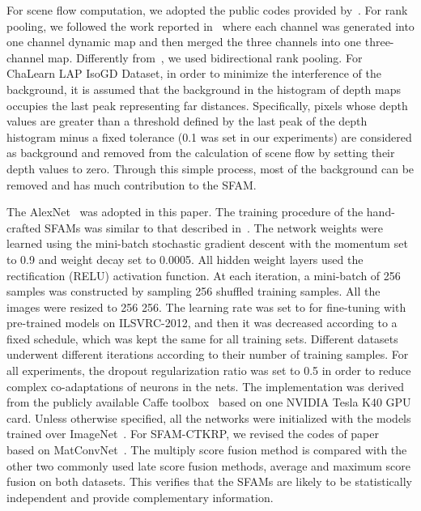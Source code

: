 \documentclass[10pt,twocolumn,letterpaper]{article}
\begin{document}
For scene flow computation, we adopted the public codes provided 
by~\cite{jaimezprimal}.
For rank pooling, we followed the work reported in~\cite{bilen2016dynamic} where 
each channel was generated into one channel dynamic map and then merged 
the three channels into one three-channel map. Differently 
from~\cite{bilen2016dynamic}, we used bidirectional rank pooling. For ChaLearn 
LAP IsoGD Dataset, in order to minimize the interference of the background, it 
is assumed that the background in the histogram of depth maps occupies the last 
peak representing far distances. Specifically, pixels whose depth values are 
greater than a threshold defined by the last peak of the depth histogram minus a 
fixed tolerance (0.1 was set in our experiments) are considered as background 
and removed from the calculation of scene flow by setting their depth values 
to zero. Through this simple process, most of the background can be removed and 
has much contribution to the SFAM.

The AlexNet~\cite{krizhevsky2012imagenet} was adopted in this paper. 
The training procedure of the hand-crafted SFAMs was similar to that described 
in~\cite{krizhevsky2012imagenet}. The network weights were learned using 
the mini-batch stochastic gradient descent with the momentum set to 0.9 
and weight decay set to 0.0005. All hidden weight layers used the 
rectification (RELU) activation function. At each iteration, a mini-batch of 256 
samples was constructed by sampling 256 shuffled training samples. All the images 
were resized to 256  256. The learning rate was set to  for 
fine-tuning with pre-trained models on ILSVRC-2012, and then it was decreased 
according to a fixed schedule, which was kept the same for all training sets. 
Different datasets underwent different iterations according to their number of 
training samples. For all experiments, the dropout regularization ratio was set 
to 0.5 in order to reduce complex co-adaptations of neurons in the nets. The 
implementation was derived from the publicly available Caffe 
toolbox~\cite{jia2014caffe} based on one {NVIDIA Tesla K40 GPU} card. Unless 
otherwise specified, all the networks were initialized with the models trained 
over ImageNet~\cite{krizhevsky2012imagenet}. For SFAM-CTKRP, we revised the 
codes of paper~\cite{bilen2016dynamic} based on 
MatConvNet~\cite{vedaldi15matconvnet}. The multiply score fusion method is compared with the other two commonly used late score fusion methods, average  and maximum score fusion on both datasets. This verifies that the SFAMs are likely to be statistically independent and provide complementary information. 
\end{document}
